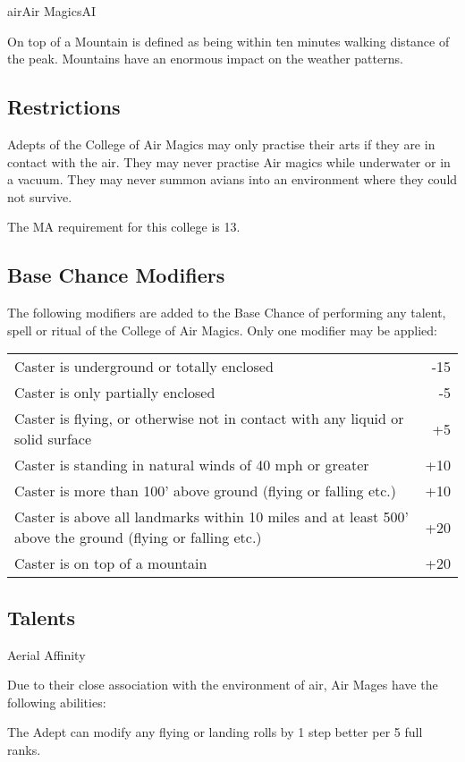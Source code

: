 \begin{college}[2.1]{air}{Air Magics}{AI}
\begin{Description}
\item[On top of a Mountain] is defined as being within ten minutes
walking distance of the peak.  Mountains have an enormous impact on
the weather patterns.
\end{Description}

\subsection{Restrictions}

Adepts of the College of Air Magics may only practise their arts if
they are in contact with the air. They may never practise Air magics
while underwater or in a vacuum. They may never summon avians into an
environment where they could not survive.

The MA requirement for this college is 13.

\subsection{Base Chance Modifiers}

The following modifiers are added to the Base Chance of performing any
talent, spell or ritual of the College of Air Magics.  Only one
modifier may be applied:

\begin{tabularx}{\linewidth}{Xr}
Caster is underground or totally enclosed	& -15 \\
Caster is only partially enclosed	& -5 \\
Caster is flying, or otherwise not in contact with any liquid or solid surface	& +5 \\
Caster is standing in natural winds of  40 mph or greater	& +10 \\
Caster is more than 100' above ground  (flying or falling etc.)	& +10 \\
Caster is above all landmarks within 10 miles and at least 500' above the ground (flying or falling etc.)	& +20 \\
Caster is on top of a mountain	& +20 \\
\end{tabularx}

\subsection{Talents}

\begin{talent}[T-1]{Aerial Affinity}
\begin{effects}
Due to their close association with the environment of air, Air Mages
have the following abilities:
\begin{Enumerate}
\item
The Adept can modify any flying or landing rolls by 1 step better per
5 full ranks.


\end{Enumerate}
\end{effects}
\end{talent}
\end{college}
